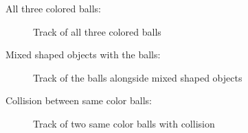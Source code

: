 \documentclass{sciposter}
\begin{document}
\begin{multicols}{3}
All three colored balls:

\begin{figure}[!h]
	\centering
			\setlength{\fboxsep}{1pt}
			\setlength{\fboxrule}{1pt}
	\caption{Track of all three colored balls}
	\label{fig:three_balls}
\end{figure}

Mixed shaped objects with the balls:

\begin{figure}[!h]
	\centering
			\setlength{\fboxsep}{1pt}
			\setlength{\fboxrule}{1pt}
	\caption{Track of the balls alongside mixed shaped objects}
	\label{fig:mixed_shape}
\end{figure}

Collision between same color balls:

\begin{figure}[!h]
	\centering
			\setlength{\fboxsep}{1pt}
			\setlength{\fboxrule}{1pt}
	\caption{Track of two same color balls with collision}
	\label{fig:call_same_color}
\end{figure}


\end{multicols}
\end{document}
